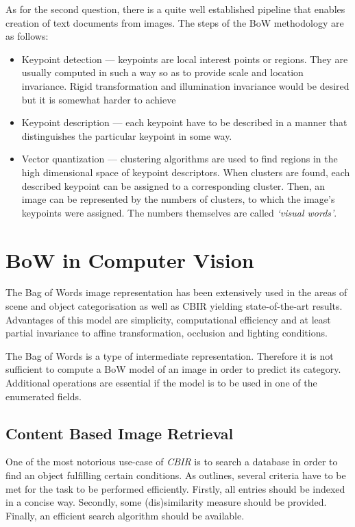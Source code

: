   As for the second question, there is a quite well established pipeline that enables creation of text documents from images. The steps of the BoW methodology are as follows:
  \begin{itemize}
   \item Keypoint detection --- keypoints are local interest points or regions. They are usually computed in such a way so as to provide scale and location invariance. Rigid transformation and illumination invariance would be desired but it is somewhat harder to achieve
   \item Keypoint description --- each keypoint have to be described in a manner that distinguishes the particular keypoint in some way.
   \item Vector quantization --- clustering algorithms are used to find regions in the high dimensional space of keypoint descriptors. When clusters are found, each described keypoint can be assigned to a corresponding cluster. Then, an image can be represented by the numbers of clusters, to which the image's keypoints were assigned. The numbers themselves are called \emph{`visual words'}.
  \end{itemize}
  
\section{BoW in Computer Vision}

  The Bag of Words image representation has been extensively used in the areas of scene \cite{csurka2004visual,fei2005bayesian, tsai2012bag} and object categorisation \cite{zhangcategory} as well as CBIR \cite{li2010investigating,toldo2009bag} yielding state-of-the-art results. Advantages of this model are simplicity, computational efficiency and at least partial invariance to affine transformation, occlusion and lighting conditions. 
  
  The Bag of Words is a type of intermediate representation. Therefore it is not sufficient to compute a BoW model of an image in order to predict its category. Additional operations are essential if the model is to be used in one of the enumerated fields.
  
  \subsection{Content Based Image Retrieval}
  
  One of the most notorious use-case of \emph{CBIR} is to search a database in order to find an object fulfilling certain conditions. As \cite{toldo2009bag} outlines, several criteria have to be met for the task to be performed efficiently. Firstly, all entries should be indexed in a concise way. Secondly, some (dis)similarity measure should be provided. Finally, an efficient search algorithm should be available.  
    
